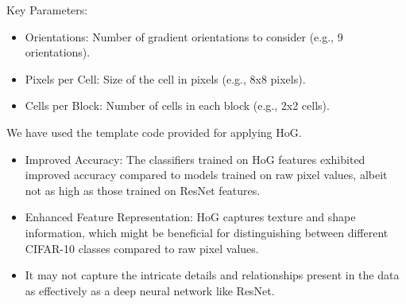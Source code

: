 \documentclass[a4paper]{article}
\theoremstyle{plain}
\theoremstyle{definition}
\begin{document}
\begin{enumerate}
Key Parameters:
\begin{itemize}
    \item Orientations: Number of gradient orientations to consider (e.g., 9 orientations).
    \item Pixels per Cell: Size of the cell in pixels (e.g., 8x8 pixels).
    \item Cells per Block: Number of cells in each block (e.g., 2x2 cells).
\end{itemize}
We have used the template code provided for applying HoG.
\begin{table}[h!]
\centering
\caption{Performance metrics measures after HoG -}
\label{my-label}
\end{table}
\begin{itemize}
    \item Improved Accuracy: The classifiers trained on HoG features exhibited improved accuracy compared to models trained on raw pixel values, albeit not as high as those trained on ResNet features.
    \item Enhanced Feature Representation: HoG captures texture and shape information, which might be beneficial for distinguishing between different CIFAR-10 classes compared to raw pixel values.
    \item It may not capture the intricate details and relationships present in the data as effectively as a deep neural network like ResNet.
\end{itemize}


\end{enumerate}
\end{document}
